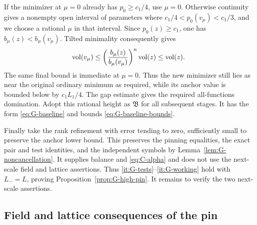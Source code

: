 If the minimizer at $\mu=0$ already has $p_0\ge c_1/4$, use $\mu=0$.
Otherwise continuity gives a nonempty open interval of parameters where
$c_1/4<p_0(v_\mu)<c_1/3$, and we choose a rational $\mu$ in that
interval.  Since $p_0(z)\ge c_1$, one has
$b_\mu(z)<b_\mu(v_\mu)$.  Tilted minimality consequently gives
\begin{equation}\label{eq:G-anchor-volume}
 \operatorname{vol}(v_\mu)
 \le\left(\frac{b_\mu(z)}{b_\mu(v_\mu)}\right)^n\operatorname{vol}(z)
 \le\operatorname{vol}(z).
\end{equation}
The same final bound is immediate at $\mu=0$.  Thus the new minimizer
still lies as near the original ordinary minimum as required, while
its anchor value is bounded below by $c_1L_1/4$.  The gap estimate gives
the required all-functions domination.  Adopt this rational height as
$\mathfrak B$ for all subsequent stages.  It has the form \eqref{eq:G-baseline} and bounds \eqref{eq:G-baseline-bounds}.

Finally take the rank refinement with error tending to zero, sufficiently
small to preserve the anchor lower bound.  This preserves the pinning
equalities, the exact pair and test identities, and the independent
symbols by Lemma~\ref{lem:G-noncancellation}.  It supplies balance and
\eqref{eq:C-alpha} and does not use the next-scale field and lattice
assertions.  Thus \ref{it:G-tests}--\ref{it:G-working} hold with $L_-=L$, proving
Proposition~\ref{prop:G-high-pin}.  It remains to verify the two
next-scale assertions.

\subsection{Field and lattice consequences of the pin}\label{subsec:G-pin-consequences}


